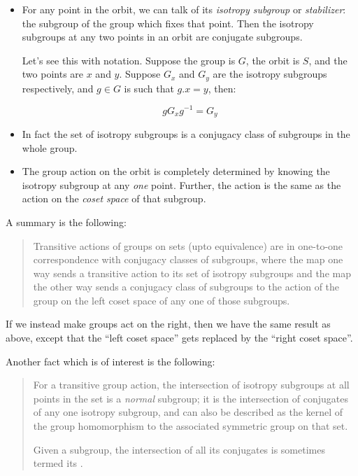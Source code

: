 \documentclass[a4paper]{amsart}
\begin{document}
\begin{itemize}

\item For any point in the orbit, we can talk of its {\em isotropy
    subgroup} or {\em stabilizer}: the subgroup of the group which
  fixes that point. Then the isotropy subgroups at any two points in
  an orbit are conjugate subgroups.

  Let's see this with notation. Suppose the group is $G$, the orbit is
  $S$, and the two points are $x$ and $y$. Suppose $G_x$ and $G_y$ are the
  isotropy subgroups respectively, and $g \in G$ is such that $g.x
  = y$, then:

  $$gG_xg^{-1} = G_y$$

\item In fact the set of isotropy subgroups is a conjugacy class of
  subgroups in the whole group.

\item The group action on the orbit is completely determined by
  knowing the isotropy subgroup at any {\em one} point. Further, the
  action is the same as the action on the {\em coset space} of that
  subgroup.

\end{itemize}

A summary is the following:

\begin{quote}
  Transitive actions of groups on sets (upto equivalence) are in one-to-one
  correspondence with conjugacy classes of subgroups, where the map one
  way sends a transitive action to its set of isotropy subgroups and the
  map the other way sends a conjugacy class of subgroups to the action
  of the group on the left coset space of any one of those subgroups.
\end{quote}

If we instead make groups act on the right, then we have the same
result as above, except that the ``left coset space'' gets replaced by
the ``right coset space''.

Another fact which is of interest is the following:

\begin{quote}
  For a transitive group action, the intersection of isotropy
  subgroups at all points in the set is a {\em normal} subgroup; it is
  the intersection of conjugates of any one isotropy subgroup, and can
  also be described as the kernel of the group homomorphism to the
  associated symmetric group on that set.

  Given a subgroup, the intersection of all its conjugates is
  sometimes termed its .
\end{quote}
\end{document}

